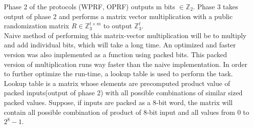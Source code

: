 Phase 2 of the protocols (WPRF, OPRF) outputs m bits $\in \mathbb{Z}_2$. Phase 3 takes output of phase 2 and performs a matrix vector multiplication with a public randomization matrix $R \in \mathbb{Z}_{3}^{t \times m} $ to output $\mathbb{Z}_{3}^{t}. $\\
Naive method of performing this matrix-vector multiplication will be to multiply and add individual bits, which will take a long time. An optimized and faster version was also implemented as a function using packed bits. This packed version of multiplication runs way faster than the naive implementation. In order to further optimize the run-time, a lookup table is used to perform the task.\\

Lookup table is a matrix whose elements are precomputed product value of packed inputs(output of phase 2) with all possible combinations of similar sized packed values. Suppose, if inputs are packed as a 8-bit word, the matrix will contain all possible combination of product of 8-bit input and all values from 0 to $2^{8}-1$. \\

